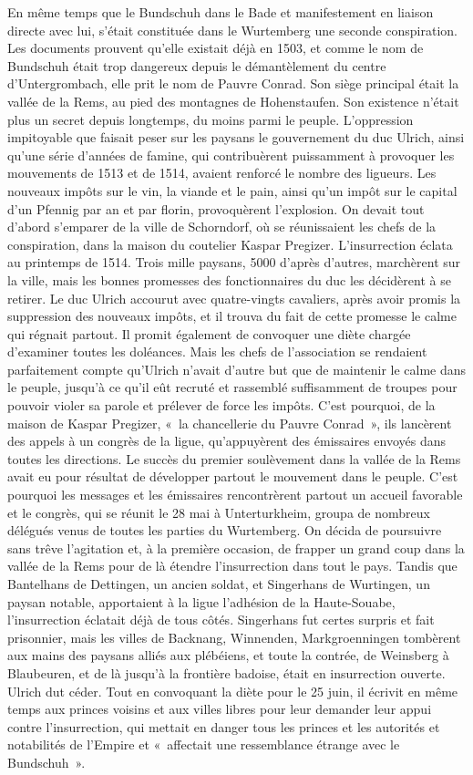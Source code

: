 \documentclass[french,twoside]{book} %
\begin{document}
En même temps que le Bundschuh dans le Bade et manifestement en liaison directe avec lui, s’était constituée dans le Wurtemberg une seconde conspiration. Les documents prouvent qu’elle existait déjà en 1503, et comme le nom de Bundschuh était trop dangereux depuis le démantèlement du centre d’Untergrombach, elle prit le nom de Pauvre Conrad. Son siège principal était la vallée de la Rems, au pied des montagnes de Hohenstaufen. Son existence n’était plus un secret depuis longtemps, du moins parmi le peuple. L’oppression impitoyable que faisait peser sur les paysans le gouvernement du duc Ulrich, ainsi qu’une série d’années de famine, qui contribuèrent puissamment à provoquer les mouvements de 1513 et de 1514, avaient renforcé le nombre des ligueurs. Les nouveaux impôts sur le vin, la viande et le pain, ainsi qu’un impôt sur le capital d’un Pfennig par an et par florin, provoquèrent l’explosion. On devait tout d’abord s’emparer de la ville de Schorndorf, où se réunissaient les chefs de la conspiration, dans la maison du coutelier Kaspar Pregizer. L’insurrection éclata au printemps de 1514. Trois mille paysans, 5000 d’après d’autres, marchèrent sur la ville, mais les bonnes promesses des fonctionnaires du duc les décidèrent à se retirer. Le duc Ulrich accourut avec quatre-vingts cavaliers, après avoir promis la suppression des nouveaux impôts, et il trouva du fait de cette promesse le calme qui régnait partout. Il promit également de convoquer une diète chargée d’examiner toutes les doléances. Mais les chefs de l’association se rendaient parfaitement compte qu’Ulrich n’avait d’autre but que de maintenir le calme dans le peuple, jusqu’à ce qu’il eût recruté et rassemblé suffisamment de troupes pour pouvoir violer sa parole et prélever de force les impôts. C’est pourquoi, de la maison de Kaspar Pregizer, « la chancellerie du Pauvre Conrad », ils lancèrent des appels à un congrès de la ligue, qu’appuyèrent des émissaires envoyés dans toutes les directions. Le succès du premier soulèvement dans la vallée de la Rems avait eu pour résultat de développer partout le mouvement dans le peuple. C’est pourquoi les messages et les émissaires rencontrèrent partout un accueil favorable et le congrès, qui se réunit le 28 mai à Unterturkheim, groupa de nombreux délégués venus de toutes les parties du Wurtemberg. On décida de poursuivre sans trêve l’agitation et, à la première occasion, de frapper un grand coup dans la vallée de la Rems pour de là étendre l’insurrection dans tout le pays. Tandis que Bantelhans de Dettingen, un ancien soldat, et Singerhans de Wurtingen, un paysan notable, apportaient à la ligue l’adhésion de la Haute-Souabe, l’insurrection éclatait déjà de tous côtés. Singerhans fut certes surpris et fait prisonnier, mais les villes de Backnang, Winnenden, Markgroenningen tombèrent aux mains des paysans alliés aux plébéiens, et toute la contrée, de Weinsberg à Blaubeuren, et de là jusqu’à la frontière badoise, était en insurrection ouverte. Ulrich dut céder. Tout en convoquant la diète pour le 25 juin, il écrivit en même temps aux princes voisins et aux villes libres pour leur demander leur appui contre l’insurrection, qui mettait en danger tous les princes et les autorités et notabilités de l’Empire et « affectait une ressemblance étrange avec le Bundschuh ».\par
\end{document}
